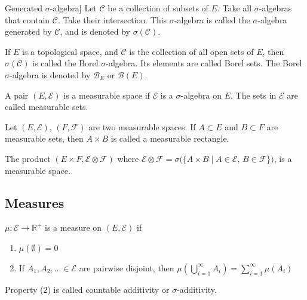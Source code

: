 \documentclass[12pt, titlepage]{article}
\begin{document}
\begin{dfn}[]Generated $\sigma$-algebra]{}
	Let $\mathcal{C}$ be a collection of subsets of $E$. Take all $\sigma$-algebras that contain $\mathcal{C}$. Take their intersection. This $\sigma$-algebra is called the $\sigma$-algebra generated by $\mathcal{C}$, and is denoted by $\sigma(\mathcal{C})$.
\end{dfn}

\begin{dfn}{}
	If $E$ is a topological space, and $\mathcal{C}$ is the collection of all open sets of $E$, then $\sigma (\mathcal{C})$ is called the Borel $\sigma$-algebra. Its elements are called Borel sets. The Borel $\sigma$-algebra is denoted by $\mathcal{B}_E$ or $\mathcal{B}(E)$.
\end{dfn}

\begin{dfn}{}
	A pair $(E, \mathcal{E})$ is a measurable space if $\mathcal{E}$ is a $\sigma$-algebra on $E$. The sets in $\mathcal{E}$ are called measurable sets.
\end{dfn}

\begin{dfn}{}
	Let $(E, \mathcal{E})$, $(F, \mathcal{F})$ are two measurable spaces. If $A \subset E$ and $B \subset F$ are measurable sets, then $A \times B$ is called a measurable rectangle.\\
\end{dfn}

\begin{dfn}{}
	The product $(E \times F, \mathcal{E} \otimes \mathcal{F})$ where $\mathcal{E} \otimes \mathcal{F} = \sigma(\{A \times B \mid A \in \mathcal{E}$, $B \in \mathcal{F}\})$, is a measurable space.\\
\end{dfn}

\subsection{Measures}

\begin{dfn}[Measure]{}
	$\mu: \mathcal{E} \to \mathbb{R^+}$ is a measure on $(E, \mathcal{E})$ if
	\begin{enumerate}
		\item $\mu(\emptyset) = 0$
		\item If $A_1, A_2, \dots \in \mathcal{E}$ are pairwise disjoint, then $\mu(\bigcup^\infty_{i = 1} A_i) = \sum^\infty_{i = 1}\mu(A_i)$
	\end{enumerate}
\end{dfn}
Property (2) is called countable additivity or $\sigma$-additivity.\\
\end{document}
